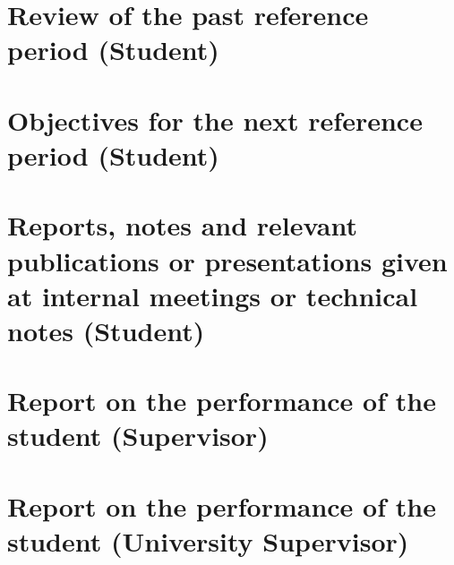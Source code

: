 \documentclass{article}
\begin{document}


\section{Review of the past reference period {\small (Student)}}
\label{sec:ReviewStudent}


\section{Objectives for the next reference period {\small (Student)}}
\label{sec:Objectives}


\section{Reports, notes and relevant publications or presentations given at internal
meetings or technical notes {\small (Student)}}
\label{sec:ReportsNotes}


\section{Report on the performance of the student {\small (Supervisor)}}


\section{Report on the performance of the student {\small (University Supervisor)}}


\end{document}
